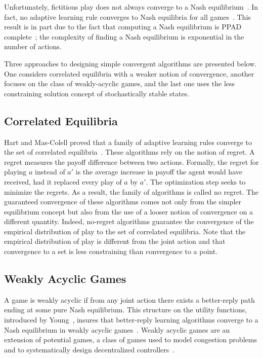 Unfortunately, fictitious play does not always converge to a Nash equilibrium~\cite{shapley:1963}.
In fact, no adaptive learning rule converges to Nash equilibria for all games~\cite{hart_mas-colell:2003}.
This result is in part due to the fact that computing a Nash equilibrium is PPAD complete~\cite{daskalakis_goldberg_papadimitriou:2006}; the complexity of finding a Nash equilibrium is exponential in the number of actions.

Three approaches to designing simple convergent algorithms are presented below.
One considers correlated equilibria with a weaker notion of convergence, another focuses on the class of weakly-acyclic games, and the last one uses the less constraining solution concept of stochastically stable states.

\subsection{Correlated Equilibria}
Hart and Mas-Colell proved that a family of adaptive learning rules converge to the set of correlated equilibria~\cite{hart_mas-colell:2000:simple,hart_mas-colell:2000:general,hart_mas-colell:2001}.
These algorithms rely on the notion of regret.
A regret measures the payoff difference between two actions.
Formally, the regret for playing \(a\) instead of \(a'\) is the average increase in payoff the agent would have received, had it replaced every play of \(a\) by \(a'\).
The optimization step seeks to minimize the regrets.
As a result, the family of algorithms is called no regret.
The guaranteed convergence of these algorithms comes not only from the simpler equilibrium concept but also from the use of a looser notion of convergence on a different quantity.
Indeed, no-regret algorithms guarantee the convergence of the empirical distribution of play to the set of correlated equilibria.
Note that the empirical distribution of play is different from the joint action and that convergence to a set is less constraining than convergence to a point.

\subsection{Weakly Acyclic Games}
A game is weakly acyclic if from any joint action there exists a better-reply path ending at some pure Nash equilibrium.
This structure on the utility functions, introduced by Young~\cite{young:1998}, insures that better-reply learning
algorithms converge to a Nash equilibrium in weakly acyclic games~\cite{young:2004}.
Weakly acyclic games are an extension of potential games, a class of games used to model congestion problems and to systematically design decentralized controllers~\cite{li_marden:2011}.

